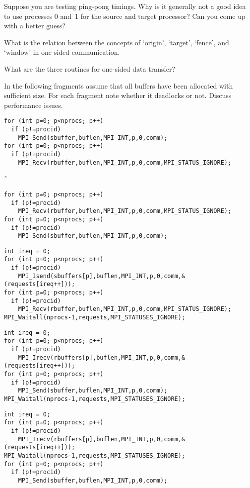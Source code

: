 \begin{review}
  Suppose you are testing ping-pong timings.
  Why is it generally not a good idea to use processes 0 and~1 for the
  source and target processor?  Can you come up with a better guess?
\end{review}

\begin{review}
  What is the relation between the concepts of `origin', `target', `fence',
  and `window' in one-sided communication.
\end{review}

\begin{review}
  What are the three routines for one-sided data transfer?
\end{review}

\lstset{
  style=reviewcode,
  language=C,
}

\begin{review}
  In the following fragments %
  assume that all buffers have been
  allocated with sufficient size. For each fragment note whether it
  deadlocks or not. Discuss performance issues.
\end{review}

    \lstset{language=C,basicstyle=\footnotesize\ttfamily}
\begin{lstlisting}
for (int p=0; p<nprocs; p++)
  if (p!=procid)
    MPI_Send(sbuffer,buflen,MPI_INT,p,0,comm);
for (int p=0; p<nprocs; p++)
  if (p!=procid)
    MPI_Recv(rbuffer,buflen,MPI_INT,p,0,comm,MPI_STATUS_IGNORE);
\end{lstlisting}
˜    %
\begin{lstlisting}
for (int p=0; p<nprocs; p++)
  if (p!=procid)
    MPI_Recv(rbuffer,buflen,MPI_INT,p,0,comm,MPI_STATUS_IGNORE);
for (int p=0; p<nprocs; p++)
  if (p!=procid)
    MPI_Send(sbuffer,buflen,MPI_INT,p,0,comm);
\end{lstlisting}
\begin{lstlisting}
int ireq = 0;
for (int p=0; p<nprocs; p++)
  if (p!=procid)
    MPI_Isend(sbuffers[p],buflen,MPI_INT,p,0,comm,&(requests[ireq++]));
for (int p=0; p<nprocs; p++)
  if (p!=procid)
    MPI_Recv(rbuffer,buflen,MPI_INT,p,0,comm,MPI_STATUS_IGNORE);
MPI_Waitall(nprocs-1,requests,MPI_STATUSES_IGNORE);
\end{lstlisting}
\begin{lstlisting}
int ireq = 0;
for (int p=0; p<nprocs; p++)
  if (p!=procid)
    MPI_Irecv(rbuffers[p],buflen,MPI_INT,p,0,comm,&(requests[ireq++]));
for (int p=0; p<nprocs; p++)
  if (p!=procid)
    MPI_Send(sbuffer,buflen,MPI_INT,p,0,comm);
MPI_Waitall(nprocs-1,requests,MPI_STATUSES_IGNORE);
\end{lstlisting}
\begin{lstlisting}
int ireq = 0;
for (int p=0; p<nprocs; p++)
  if (p!=procid)
    MPI_Irecv(rbuffers[p],buflen,MPI_INT,p,0,comm,&(requests[ireq++]));
MPI_Waitall(nprocs-1,requests,MPI_STATUSES_IGNORE);
for (int p=0; p<nprocs; p++)
  if (p!=procid)
    MPI_Send(sbuffer,buflen,MPI_INT,p,0,comm);
\end{lstlisting}

